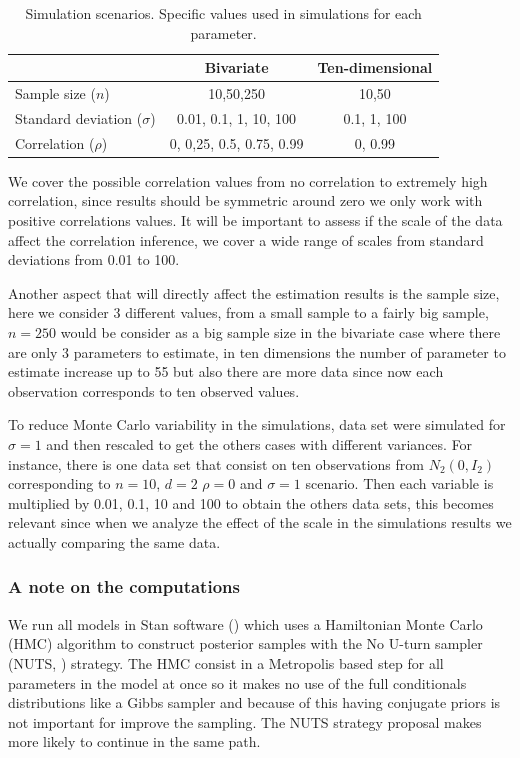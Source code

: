 \documentclass{article}
\begin{document}
\begin{table}[htbp]
   \centering
   \caption{Simulation scenarios. Specific values used in simulations for each parameter. \label{scen}} 
     \begin{tabular}{lcc} \hline
          &  Bivariate    & Ten-dimensional  \\ \hline
      Sample size   ($n$)   & 10,50,250   &  10,50  \\
      Standard deviation ($\sigma$)  & 0.01, 0.1, 1, 10, 100 & 0.1, 1, 100 \\
      Correlation ($\rho$)   &  0, 0,25, 0.5, 0.75, 0.99  &  0, 0.99 \\ \hline
   \end{tabular}
\end{table}

We cover the possible correlation values from no correlation to extremely high correlation, since results should be symmetric around zero we only work with positive correlations values. It will be important to assess if the scale of the data affect the correlation inference, we cover a wide range of scales from standard deviations from 0.01 to 100. 

Another aspect that will directly affect the estimation results is the sample size, here we consider 3 different values, from a small sample to a fairly big sample, $n=250$ would be consider as a big sample size in the bivariate case where there are only 3 parameters to estimate, in ten dimensions the number of parameter to estimate increase up to 55 but also there are more data since now each observation corresponds to ten observed values. 

To reduce Monte Carlo variability in the simulations, data set were simulated for $\sigma=1$ and then rescaled to get the others cases with different variances. For instance, there is one data set that consist on ten observations from $N_2(0, I_2 )$ corresponding to $n=10$, $d=2$ $\rho=0$ and $\sigma=1$ scenario. Then each variable is multiplied by 0.01, 0.1, 10  and 100 to obtain the others data sets, this becomes relevant since when we analyze the effect of the scale in the simulations results we actually comparing the same data. 

\subsubsection{A note on the computations}
We run all models in Stan software (\cite{stan2014}) which uses a Hamiltonian Monte Carlo (HMC) algorithm to construct posterior samples with the No U-turn sampler (NUTS, \cite{hoffman2011no}) strategy. The HMC consist in a Metropolis based step for all parameters in the model at once so it makes no use of the full conditionals distributions like a Gibbs sampler and because of this having conjugate priors is not important for improve the sampling. The NUTS strategy proposal makes more likely to continue in the same path.  
\end{document}
